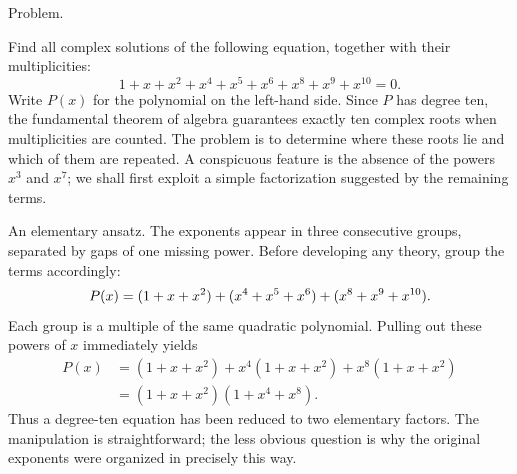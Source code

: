\documentclass[11pt,aspectratio=169]{beamer}
\newcommand{\slidebody}{%
  \fontsize{10.6}{12.8}\selectfont\justifying%
  \setlength{\parskip}{4.2pt}%
  \setlength{\abovedisplayskip}{4pt}%
  \setlength{\belowdisplayskip}{4pt}%
  \setlength{\abovedisplayshortskip}{2pt}%
  \setlength{\belowdisplayshortskip}{2.5pt}%
}
\newcommand{\tightbody}{\slidebody\fontsize{10.2}{12.3}\selectfont\setlength{\parskip}{3pt}}
\newcommand{\smallequation}{\fontsize{10.5}{13}\selectfont}
\begin{document}
\begin{frame}[t]{Problem.}
\slidebody
Find all complex solutions of the following equation, together with their multiplicities:
\begin{equation}\label{eq:problem}
  1+x+x^2+x^4+x^5+x^6+x^8+x^9+x^{10}=0.
\end{equation}
Write $P(x)$ for the polynomial on the left-hand side. Since $P$ has degree ten, the fundamental theorem of algebra guarantees exactly ten complex roots when multiplicities are counted. The problem is to determine where these roots lie and which of them are repeated. A conspicuous feature is the absence of the powers $x^3$ and $x^7$; we shall first exploit a simple factorization suggested by the remaining terms.
\end{frame}

\begin{frame}[t]{An elementary ansatz.}
\tightbody
The exponents appear in three consecutive groups, separated by gaps of one missing power. Before developing any theory, group the terms accordingly:
\begin{equation}\label{eq:grouping}
\smallequation
  P(x)=(1+x+x^2)+(x^4+x^5+x^6)+(x^8+x^9+x^{10}).
\end{equation}
Each group is a multiple of the same quadratic polynomial. Pulling out these powers of $x$ immediately yields
\begin{equation}\label{eq:ansatz}
\begin{aligned}
 P(x)&=(1+x+x^2)+x^4(1+x+x^2)+x^8(1+x+x^2)\\
     &=(1+x+x^2)(1+x^4+x^8).
\end{aligned}
\end{equation}
Thus a degree-ten equation has been reduced to two elementary factors. The manipulation is straightforward; the less obvious question is why the original exponents were organized in precisely this way.
\end{frame}
\end{document}
